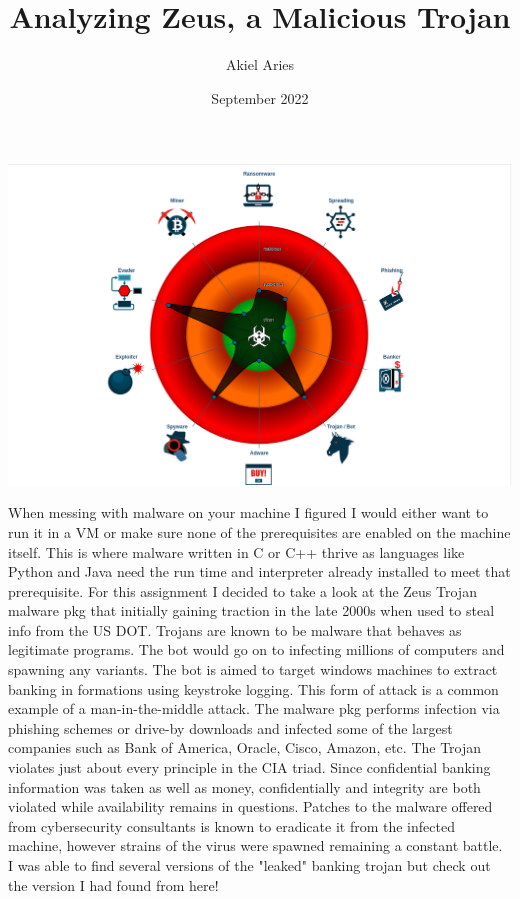 \documentclass[12pt, letterpaper]{article}
\title{Analyzing Zeus, a Malicious Trojan}
\author{Akiel Aries}
\date{September 2022}
\begin{document}
\maketitle
\begin{sloppypar}

\includegraphics[scale=0.3]{ZEUS_CLASSIFICATION.png}


When messing with malware on your machine I figured I would either want 
to run it in a VM or make sure none of the prerequisites are enabled on
the machine itself. This is where malware written in C or C++ thrive as
languages like Python and Java need the run time and interpreter already
installed to meet that prerequisite. For this assignment I decided to
take a look at the Zeus Trojan malware pkg that initially gaining
traction in the late 2000s when used to steal info from the US DOT.
Trojans are known to be malware that behaves as legitimate programs. The
bot would go on to infecting millions of computers and spawning any
variants. The bot is aimed to target windows machines to extract banking
in formations using keystroke logging. This form of attack is a common
example of a man-in-the-middle attack. The malware pkg performs
infection via phishing schemes or drive-by downloads and infected some
of the largest companies such as Bank of America, Oracle, Cisco, Amazon,
etc. The Trojan violates just about every principle in the CIA triad.
Since confidential banking information was taken as well as money,
confidentially and integrity are both violated while availability
remains in questions. Patches to the malware offered from cybersecurity
consultants is known to eradicate it from the infected machine, however
strains of the virus were spawned remaining a constant battle.
I was able to find several versions of the "leaked" banking trojan but
check out the version I had found from here!


\end{sloppypar}
\end{document}
